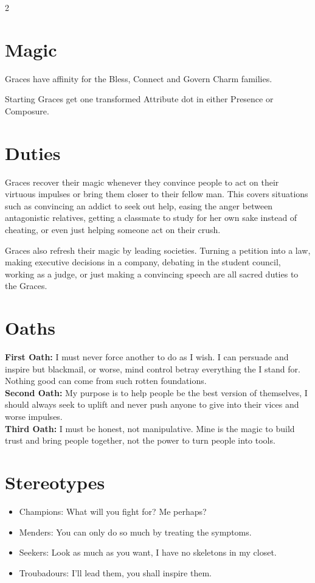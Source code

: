 \begin{multicols}{2}
\section*{Magic}

Graces have affinity for the Bless, Connect and Govern Charm families.

Starting Graces get one transformed Attribute dot in either Presence or Composure. 

\section*{Duties}
Graces recover their magic whenever they convince people to act on their virtuous impulses or bring them closer to their fellow man. This covers situations such as convincing an addict to seek out help, easing the anger between antagonistic relatives, getting a classmate to study for her own sake instead of cheating, or even just helping someone act on their crush. 

Graces also refresh their magic by leading societies. Turning a petition into a law, making executive decisions in a company, debating in the student council, working as a judge, or just making a convincing speech are all sacred duties to the Graces. 

\section*{Oaths}
\noindent \textbf{First Oath:} I must never force another to do as I wish. I can persuade and inspire but blackmail, or worse, mind control betray everything the I stand for. Nothing good can come from such rotten foundations. \\ %

\noindent \textbf{Second Oath:} My purpose is to help people be the best version of themselves, I should always seek to uplift and never push anyone to give into their vices and worse impulses. \\

\noindent \textbf{Third Oath:} I must be honest, not manipulative. Mine is the magic to build trust and bring people together, not the power to turn people into tools. 

\section*{Stereotypes}
\begin{itemize}
\item Champions: What will you fight for? Me perhaps?
\item Menders: You can only do so much by treating the symptoms. 
\item Seekers: Look as much as you want, I have no skeletons in my closet. 
\item Troubadours: I'll lead them, you shall inspire them.


\end{itemize}
\end{multicols}
